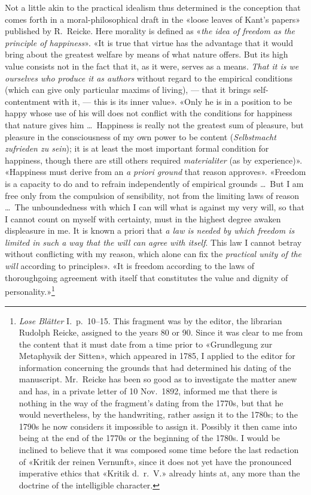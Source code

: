 \documentclass[12pt,a4paper]{article}
\newcommand{\opage}[1]{\marginnote{\footnotesize\textit{[#1]}}}
\begin{document}
Not a little akin to the practical idealism thus determined is the
conception that comes forth in a moral-philosophical draft in the «loose
leaves of Kant's papers» published by R.\ Reicke. Here morality is defined
as «\emph{the idea of freedom as the principle of happiness}». «It is true that
virtue has the advantage that it would bring about the greatest welfare by
means of what nature offers. But its high value consists not in the fact
that it, as it were, serves as a means. \emph{That it is we ourselves who produce
it as authors} without regard to the empirical conditions (which can give
only particular maxims of living), --- that it brings self-contentment with
it, --- this is its inner value». «Only he is in a position to be happy
whose use of his will does not conflict with the conditions for happiness
that nature gives him \ldots\ Happiness is really not the greatest sum of
pleasure, but pleasure in the consciousness of my own power to be content
(\textit{\emph{Selbstmacht} zufrieden zu sein}); it is at least the most important
formal condition for happiness, though there are still others required
\textit{materialiter} (as by experience)». «Happiness must derive from an \emph{a
priori ground} that reason approves». «Freedom is a capacity to do and to
refrain independently of empirical grounds \ldots\ But I am free only from
the compulsion of sensibility, not from the limiting laws of reason \ldots\
The unboundedness with which I can will what is against my very will, so
that I cannot count on myself with certainty, must in the highest degree
awaken displeasure in me. It is known a priori that \emph{a law is needed by which
freedom is limited in such a way that the will can agree with itself}. This
law I cannot betray without conflicting with my reason, which alone can fix
the \emph{practical unity of the will} according to principles». \opage{43}«It is freedom
according to the laws of thoroughgoing agreement with itself that
constitutes the value and dignity of personality.»\footnote{\textit{Lose
Blätter} I.\ p.\ 10--15. This fragment was by the editor, the librarian
Rudolph Reicke, assigned to the years 80 or 90. Since it was clear to me
from the content that it must date from a time prior to «Grundlegung zur
Metaphysik der Sitten», which appeared in 1785, I applied to the editor for
information concerning the grounds that had determined his dating of the
manuscript. Mr.\ Reicke has been so good as to investigate the matter anew
and has, in a private letter of 10 Nov.\ 1892, informed me that there is
nothing in the way of the fragment's dating from the 1770s, but that he
would nevertheless, by the handwriting, rather assign it to the 1780s; to
the 1790s he now considers it impossible to assign it. Possibly it then came
into being at the end of the 1770s or the beginning of the 1780s. I would be
inclined to believe that it was composed some time before the last redaction
of «Kritik der reinen Vernunft», since it does not yet have the pronounced
imperative ethics that «Kritik d.\ r.\ V.» already hints at, any more than
the doctrine of the intelligible character.}
\end{document}
